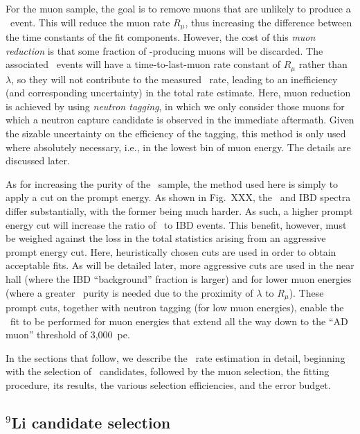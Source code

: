 \documentclass[../thesis.tex]{subfiles}
\begin{document}
For the muon sample, the goal is to remove muons that are unlikely to produce a \linine\ event. This will reduce the muon rate $R_\mu$, thus increasing the difference between the time constants of the fit components. However, the cost of this \emph{muon reduction} is that some fraction of \linine-producing muons will be discarded. The associated \linine\ events will have a time-to-last-muon rate constant of $R_\mu$ rather than $\lambda$, so they will not contribute to the measured \linine\ rate, leading to an inefficiency (and corresponding uncertainty) in the total rate estimate. Here, muon reduction is achieved by using \emph{neutron tagging}, in which we only consider those muons for which a neutron capture candidate is observed in the immediate aftermath. Given the sizable uncertainty on the efficiency of the tagging, this method is only used where absolutely necessary, i.e., in the lowest bin of muon energy. The details are discussed later.

As for increasing the purity of the \linine\ sample, the method used here is simply to apply a cut on the prompt energy. As shown in Fig.~XXX, the \linine\ and IBD spectra differ substantially, with the former being much harder. As such, a higher prompt energy cut will increase the ratio of \linine\ to IBD events. This benefit, however, must be weighed against the loss in the total statistics arising from an aggressive prompt energy cut. Here, heuristically chosen cuts are used in order to obtain acceptable fits. As will be detailed later, more aggressive cuts are used in the near hall (where the IBD ``background'' fraction is larger) and for lower muon energies (where a greater \linine\ purity is needed due to the proximity of $\lambda$ to $R_\mu$). These prompt cuts, together with neutron tagging (for low muon energies), enable the \linine\ fit to be performed for muon energies that extend all the way down to the ``AD muon'' threshold of 3,000~pe.

In the sections that follow, we describe the \linine\ rate estimation in detail, beginning with the selection of \linine\ candidates, followed by the muon selection, the fitting procedure, its results, the various selection efficiencies, and the error budget.

\subsection{$^9$Li candidate selection}
\label{sec:bkgLi9Sel}
\end{document}
